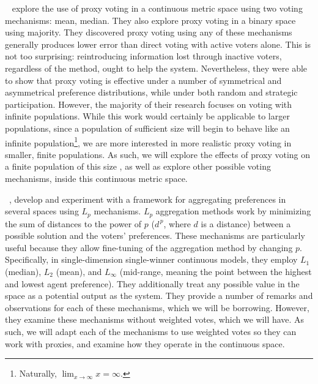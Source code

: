 ~\cite{Cohensius2017} explore the use of proxy voting in a
continuous metric space using two voting mechanisms: mean, median.
They also explore proxy voting in a binary space using majority.
They discovered proxy voting using any of these mechanisms generally produces lower
error than direct voting with active voters alone.
This is not too surprising: reintroducing information lost through inactive voters,
regardless of the method, ought to help the system.
Nevertheless, they were able to show that proxy voting is effective under a number of
symmetrical and asymmetrical preference distributions, while under both random and
strategic participation.
However, the majority of their research focuses on voting with infinite populations.
While this work   would certainly be applicable to larger populations, since a
population of sufficient size will begin to behave like an infinite
population\footnote{
    Naturally, $\lim_{x \rightarrow \infty} x = \infty$.
}, we are more interested in more realistic proxy voting in smaller, finite populations.
As such, we will explore the effects of proxy voting on a finite population of this
size , as well as explore other possible voting mechanisms, inside this continuous
metric space.

~\cite{Bulteau2021}, develop and experiment with a framework for
aggregating preferences in several spaces using $L_p$ mechanisms.
$L_p$ aggregation methods work by minimizing the sum of distances to the power of $p$
($d^{\,p}$, where $d$ is a distance) between a possible solution and the voters'
preferences.
These mechanisms are particularly useful because they allow fine-tuning of the
aggregation method by changing $p$.
Specifically, in single-dimension single-winner continuous models, they employ $L_1$
(median),
$L_2$ (mean), and $L_{\infty}$ (mid-range, meaning the point between the highest and
lowest agent preference).
They additionally treat any possible value in the space as a potential output as the
system.
They provide a number of remarks and observations for each of these mechanisms, which
we will be borrowing.
However, they examine these mechanisms without weighted votes, which we will have.
As such, we will adapt each of the mechanisms to use weighted votes so they can work
with proxies, and examine how they operate in the continuous space.

